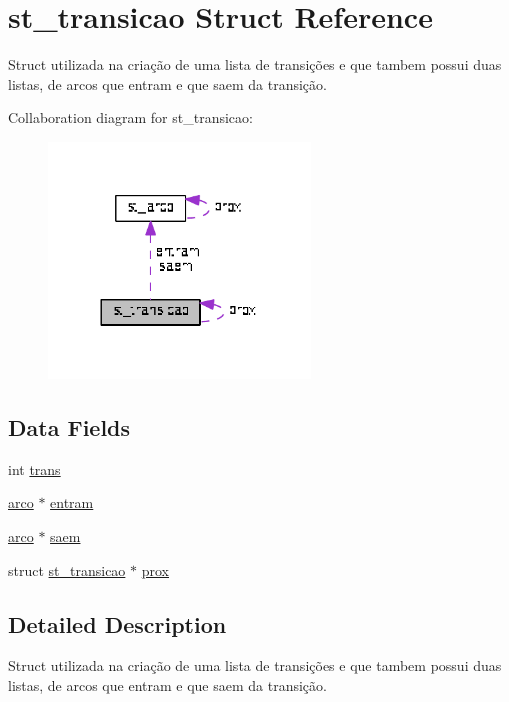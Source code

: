 \hypertarget{structst__transicao}{\section{st\+\_\+transicao Struct Reference}
\label{structst__transicao}
}


Struct utilizada na criação de uma lista de transições e que tambem possui duas listas, de arcos que entram e que saem da transição.  




Collaboration diagram for st\+\_\+transicao\+:\nopagebreak
\begin{figure}[H]
\begin{center}
\leavevmode
\includegraphics[width=197pt]{structst__transicao__coll__graph}
\end{center}
\end{figure}
\subsection*{Data Fields}
\begin{DoxyCompactItemize}
\item 
int \hyperlink{structst__transicao_a22bd0f442dc1aaab89357adf10199cc2}{trans}
\item 
\hyperlink{ex12_8c_a903d87a3126ea1585f84d7cdf488c4a3}{arco} $\ast$ \hyperlink{structst__transicao_ac6c32a5c66564a64d08f8236fbd8f0cb}{entram}
\item 
\hyperlink{ex12_8c_a903d87a3126ea1585f84d7cdf488c4a3}{arco} $\ast$ \hyperlink{structst__transicao_ad8423428e8e7544bbed187f4a78b11ab}{saem}
\item 
struct \hyperlink{structst__transicao}{st\+\_\+transicao} $\ast$ \hyperlink{structst__transicao_a48dfc1e8eb0e9d01877112b340d7ba5c}{prox}
\end{DoxyCompactItemize}


\subsection{Detailed Description}
Struct utilizada na criação de uma lista de transições e que tambem possui duas listas, de arcos que entram e que saem da transição. 



